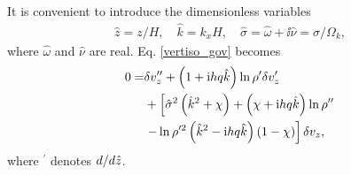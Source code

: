 It is convenient to introduce the dimensionless variables
\begin{align}
  \hat{z} = z/H,\quad \hat{k}=k_xH, \quad \hat{\sigma} =\hat{\omega} +
  \ii\hat{\nu}= \sigma/\Omega_k,
\end{align}
where $\hat{\omega}$ and $\hat{\nu}$ are real. 
Eq. \ref{vertiso_gov} becomes 
\begin{align}
  0=& \delta v_z ^{\prime\prime} + \left(1 + \mathrm{i} h
    q\hat{k}\right)\ln\rho^{\prime}\delta v_z^\prime \notag\\
  &+
  \left[\hat{\sigma}^2\left(\hat{k}^2+\chi\right) +
    \left(  \chi + \mathrm{i} h q\hat{k}\right)\ln\rho^{\prime\prime}\right.
  \notag\\
  &\left.- \ln\rho^{\prime
      2}\left(\hat{k}^2 -
      \mathrm{i} h
      q\hat{k}\right)\left(1 - \chi\right)\right]\delta v_z,\label{vertiso_gov_nondim}
\end{align}
where $^\prime$ denotes $d/d\hat{z}$.
